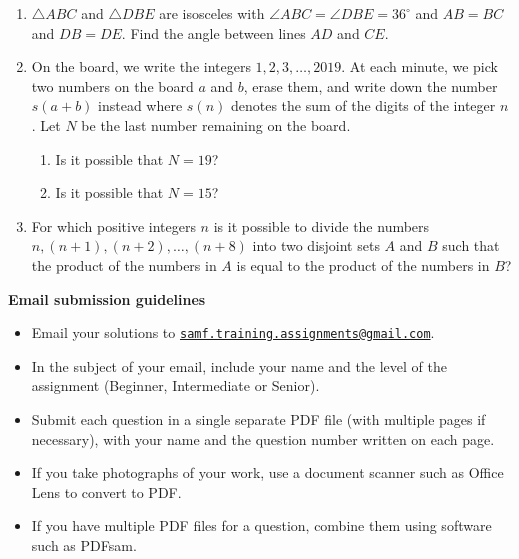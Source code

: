 \documentclass{article}
\begin{document}
\begin{enumerate}[1.]
\vspace{6pt}
\item 
$\triangle ABC$ and $\triangle DBE$ are isosceles with $\angle ABC = \angle DBE = 36^{\circ}$ and $AB = BC$ and $DB = DE$. Find the angle between lines $AD$ and $CE$.

\vspace{6pt}
\item  %
On the board, we write the integers $1, 2, 3, \dots, 2019$. At each minute, we pick two numbers on the board $a$ and $b$, erase them, and write down the number $s(a + b)$ instead where $s(n)$ denotes the sum of the digits of the integer $n$. Let $N$ be the last number remaining on the board.
\begin{enumerate}
	\item Is it possible that $N = 19$?
	\item Is it possible that $N = 15$?
\end{enumerate}

\vspace{6pt}
\item  %
For which positive integers $n$ is it possible to divide the numbers $n, (n + 1), (n + 2), \dots, (n + 8)$ into two disjoint sets $A$ and $B$ such that the product of the numbers in $A$ is equal to the product of the numbers in $B$?

\end{enumerate}


\vfill
\textbf{\Large Email submission guidelines}
\begin{itemize}
	\item Email your solutions to \href{mailto:samf.training.assignments@gmail.com}{\texttt{samf.training.assignments@gmail.com}}.
	\item In the subject of your email, include your name and the level of the assignment (Beginner, Intermediate or Senior).
	\item Submit each question in a single separate PDF file (with multiple pages if necessary), with your name and the question number written on each page.
	\item If you take photographs of your work, use a document scanner such as Office Lens to convert to PDF.
	\item If you have multiple PDF files for a question, combine them using software such as PDFsam.
\end{itemize}
\end{document}
